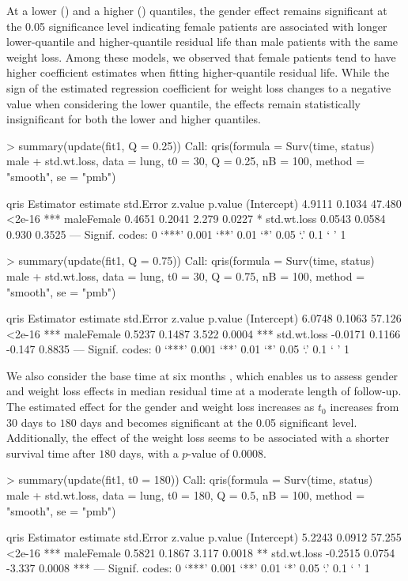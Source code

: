 At a lower () and a higher () quantiles, 
the gender effect remains significant at the 0.05 significance level indicating 
female patients are associated with longer lower-quantile and higher-quantile residual life 
than male patients with the same weight loss. 
Among these models, we observed that female patients tend to have higher coefficient estimates 
when fitting higher-quantile residual life. 
While the sign of the estimated regression coefficient for weight loss changes to a negative value 
when considering the lower quantile, the effects remain statistically insignificant for 
both the lower and higher quantiles.


\begin{example}
  > summary(update(fit1, Q = 0.25))
  Call:
  qris(formula = Surv(time, status) ~ male + std.wt.loss,
  data = lung, t0 = 30, Q = 0.25, nB = 100, method = "smooth", 
  se = "pmb")

  qris Estimator
              estimate std.Error z.value p.value    
  (Intercept)   4.9111    0.1034  47.480  <2e-16 ***
  maleFemale    0.4651    0.2041   2.279  0.0227 *  
  std.wt.loss   0.0543    0.0584   0.930  0.3525    
  ---
  Signif. codes:  0 ‘***’ 0.001 ‘**’ 0.01 ‘*’ 0.05 ‘.’ 0.1 ‘ ’ 1
\end{example}
% 
\begin{example}
  > summary(update(fit1, Q = 0.75))
  Call:
  qris(formula = Surv(time, status) ~ male + std.wt.loss,
  data = lung, t0 = 30, Q = 0.75, nB = 100, method = "smooth", 
  se = "pmb")

  qris Estimator
               estimate std.Error z.value p.value    
  (Intercept)    6.0748    0.1063  57.126  <2e-16 ***
  maleFemale     0.5237    0.1487   3.522  0.0004 ***
  std.wt.loss   -0.0171    0.1166  -0.147  0.8835    
  ---
  Signif. codes:  0 ‘***’ 0.001 ‘**’ 0.01 ‘*’ 0.05 ‘.’ 0.1 ‘ ’ 1
\end{example}
% 

We also consider the base time at six months , 
which enables us to assess gender and weight loss effects in median residual time at a moderate length of follow-up.
The estimated effect for the gender and weight loss increases as $t_0$ increases from $30$ days to $180$ days and 
becomes significant at the 0.05 significant level.
Additionally, the effect of the weight loss seems to be associated with a shorter survival time after 
$180$ days, with a $p$-value of $0.0008$.

\begin{example}
  > summary(update(fit1, t0 = 180))
  Call:
  qris(formula = Surv(time, status) ~ male + std.wt.loss,
  data = lung, t0 = 180, Q = 0.5, nB = 100, method = "smooth", 
  se = "pmb")

  qris Estimator
               estimate std.Error z.value p.value    
  (Intercept)    5.2243    0.0912  57.255  <2e-16 ***
  maleFemale     0.5821    0.1867   3.117  0.0018 ** 
  std.wt.loss   -0.2515    0.0754  -3.337  0.0008 ***
  ---
  Signif. codes:  0 ‘***’ 0.001 ‘**’ 0.01 ‘*’ 0.05 ‘.’ 0.1 ‘ ’ 1
\end{example}
% 

